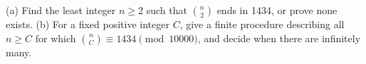 (a) Find the least integer $n\ge2$ such that $\binom n2$ ends in 1434, or prove none exists. (b) For a fixed positive integer $C$, give a finite procedure describing all $n\ge C$ for which $\binom nC\equiv1434\pmod{10000}$, and decide when there are infinitely many.

